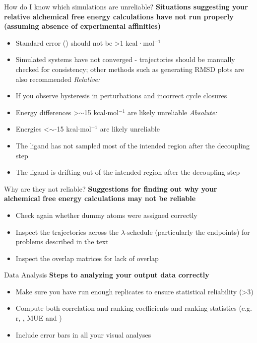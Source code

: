 \documentclass[9pt,bestpractices,pubversion]{livecoms}
\begin{document}
\begin{Checklists*}
\begin{checklist}{How do I know which simulations are unreliable?}
    \textbf{Situations suggesting your relative alchemical free energy calculations have not run properly (assuming absence of experimental affinities)}
        \begin{itemize}
                \item Standard error (\textsigma) should not be \textgreater1 kcal·mol$^{-1}$ 
    \item Simulated systems have not converged - trajectories should be manually checked for consistency; other methods such as generating RMSD plots are also recommended
    \newline\newline\textit{Relative:}
    \item If you observe hysteresis in perturbations and incorrect cycle closures
    \item Energy differences \textgreater$\sim$15 kcal$\cdot$mol$^{-1}$  are likely unreliable
    \newline\newline\textit{Absolute:}
    \item Energies \textless$\sim$-15 kcal$\cdot$mol$^{-1}$  are likely unreliable
    \item The ligand has not sampled most of the intended region after the decoupling step
    \item The ligand is drifting out of the intended region after the decoupling step
        \end{itemize}
\end{checklist}

\begin{checklist}{Why are they not reliable?}
    \textbf{Suggestions for finding out why your alchemical free energy calculations may not be reliable}
\begin{itemize}
    \item Check again whether dummy atoms were assigned correctly
    \item Inspect the trajectories across the $\lambda$-schedule (particularly the endpoints) for problems described in the text
    \item Inspect the overlap matrices for lack of overlap
\end{itemize}
\end{checklist}

\begin{checklist}{Data Analysis}
    \textbf{Steps to analyzing your output data correctly}
\begin{itemize}
    \item Make sure you have run enough replicates to ensure statistical reliability (\textgreater3)
    \item Compute both correlation and ranking coefficients and ranking statistics (e.g. r, \textrho, MUE and \texttau)
    \item Include error bars in all your visual analyses
\end{itemize}
\end{checklist}
\end{Checklists*}
\clearpage
\end{document}
